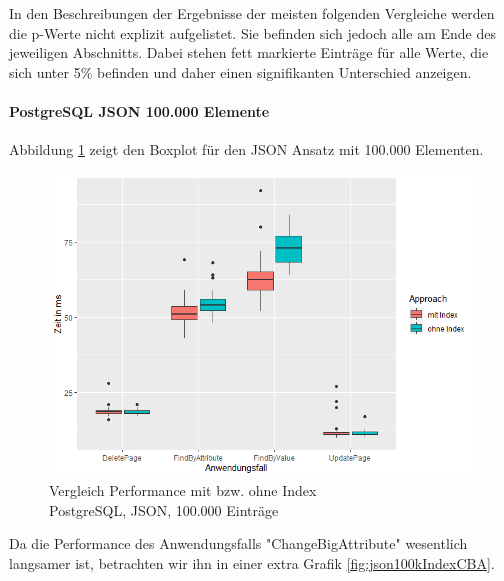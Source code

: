 In den Beschreibungen der Ergebnisse der meisten folgenden Vergleiche werden die p-Werte nicht explizit aufgelistet. Sie befinden sich jedoch alle am Ende des jeweiligen Abschnitts. Dabei stehen fett markierte Einträge für alle Werte, die sich unter 5\% befinden und daher einen signifikanten Unterschied anzeigen.

\paragraph*{PostgreSQL JSON 100.000 Elemente}
Abbildung \ref{fig:json100kOtherCases} zeigt den Boxplot für den JSON Ansatz mit 100.000 Elementen.

\begin{figure}[H]
\centering
\includegraphics[scale=0.5]{rStudioPictures/json100kIndex700500.png}
\caption{Vergleich Performance mit bzw. ohne Index \\ PostgreSQL, JSON, 100.000 Einträge}
\label{fig:json100kOtherCases}
\end{figure}

Da die Performance des Anwendungsfalls "ChangeBigAttribute" wesentlich langsamer ist, betrachten wir ihn in einer extra Grafik \ref{fig:json100kIndexCBA}.


